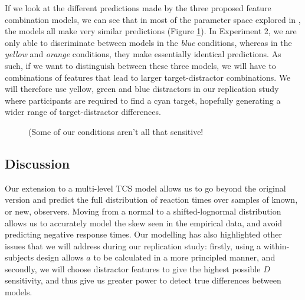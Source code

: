 \documentclass[smallextended, natbib]{svjour3}       %
\begin{document}
If we look at the different predictions made by the three proposed feature combination models, we can see that in most of the parameter space explored in \citep{buetti2019predicting}, the models all make very similar predictions (Figure \ref{fig:buetti2019_D_issue}). In Experiment 2, we are only able to discriminate between models in the \textit{blue} conditions, whereas in the \textit{yellow} and \textit{orange} conditions, they make essentially identical predictions. As such, if we want to distinguish between these three models, we will have to combinations of features that lead to larger target-distractor combinations. We will therefore use yellow, green and blue distractors in our replication study where participants are required to find a cyan target, hopefully generating a wider range of target-distractor differences.

\begin{figure}
\centering
{}
\caption{(Some of our conditions aren't all that sensitive!}
\label{fig:buetti2019_D_issue}
\end{figure}

\subsection{Discussion}

Our extension to a multi-level TCS model allows us to go beyond the original version and predict the full distribution of reaction times over samples of known, or new, observers. Moving from a normal to a shifted-lognormal distribution allows us to accurately model the skew seen in the empirical data, and avoid predicting negative response times. Our modelling has also highlighted other issues that we will address during our replication study: firstly, using a within-subjects design allows $a$ to be calculated in a more principled manner, and secondly, we will choose distractor features to give the highest possible $D$ sensitivity, and thus give us greater power to detect true differences between models.
\end{document}
